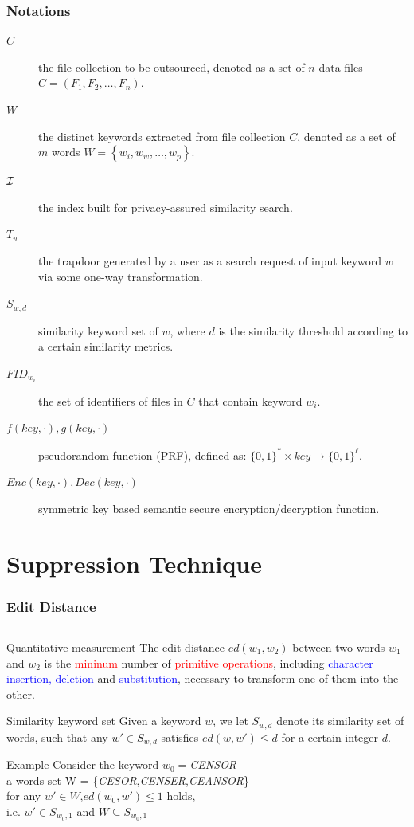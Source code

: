 \documentclass{beamer}
\begin{document}
\begin{frame}
	\frametitle{Notations}
	\begin{description}
		\item[$C$]the file collection to be outsourced, denoted as a set of $n$ data files $C = ({F_1},{F_2}, \ldots ,{F_n})$.
		\item[$W$]the distinct keywords extracted from file collection $C$, denoted as a set of $m$ words $W = \left\{ {{w_i},{w_w}, \ldots ,{w_p}} \right\}$.
		\item[$\cal I$]the index built for privacy-assured similarity search.
		\item[${T_w}$] the trapdoor generated by a user as a search request of input keyword $w$ via some one-way transformation.
		\item[${S_{w,d}}$] similarity keyword set of $w$, where $d$ is the similarity threshold according to a certain similarity metrics.
		\item[$FI{D_{{w_i}}}$]the set of identifiers of files in $C$ that contain keyword ${{w_i}}$.
		\item[$f(key, \cdot ),g(key, \cdot )$]pseudorandom function (PRF), defined	as: ${\{ 0,1\} ^*} \times key \to {\{ 0,1\} ^{\ell }}$.
		\item[$Enc(key, \cdot ),Dec(key, \cdot )$]symmetric key based semantic secure encryption/decryption function.
	\end{description}
\end{frame}
\section{Suppression Technique}
\begin{frame}
	\frametitle{Edit Distance}
	\begin{columns}
	\end{columns}
	\begin{block}{Quantitative measurement}
		The edit distance $ed({w_1},{w_2})$ between two words ${w_1}$ and ${w_2}$ is the \textcolor{red}{mininum} number of \textcolor{red}{primitive operations}, including \textcolor{blue}{character insertion, deletion} and \textcolor{blue}{substitution}, necessary to transform one of them into the other.
	\end{block}
	
	\begin{block}{Similarity keyword set}
		Given a keyword $w$, we let ${S_{w,d}}$ denote its similarity set of words, such that any $w' \in {S_{w,d}}$ satisfies \textcolor[rgb]{0.1,0.6,0.3}{$ed(w,w') \le d$}  for a certain integer $d$.
	\end{block}
	
	\begin{exampleblock}{Example}
		Consider the keyword $w_0=$\textit{CENSOR}\\
		a words set W = \{\textit{CESOR},\textit{CENSER},\textit{CEANSOR}\}\\
		for any $w' \in W$,$ed({w_0},w') \le 1$ holds,\\
		i.e. $w' \in {S_{{w_0},1}}$ and $W \subseteq {S_{{w_0},1}}$
	\end{exampleblock}
\end{frame}
\end{document}
